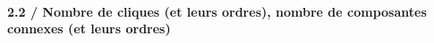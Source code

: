 \documentclass[11pt]{article}
\begin{document}
    \begin{center}
    \end{center}
    { \hspace*{\fill} \\}
    
    \begin{center}
    \end{center}
    { \hspace*{\fill} \\}
    
    \paragraph{2.2 / Nombre de cliques (et leurs ordres), nombre de
composantes connexes (et leurs
ordres)}\label{nombre-de-cliques-et-leurs-ordres-nombre-de-composantes-connexes-et-leurs-ordres}
\end{document}

